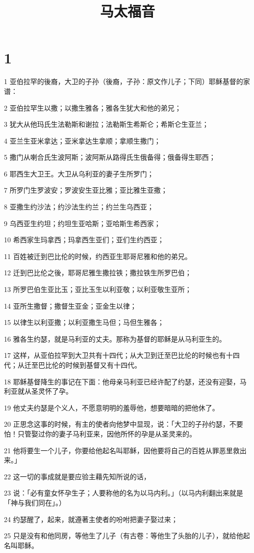 

\title{马太福音}


\chapter{1}

\par 1 亚伯拉罕的後裔，大卫的子孙（後裔，子孙：原文作儿子；下同）耶稣基督的家谱：
\par 2 亚伯拉罕生以撒；以撒生雅各；雅各生犹大和他的弟兄；
\par 3 犹大从他玛氏生法勒斯和谢拉；法勒斯生希斯仑；希斯仑生亚兰；
\par 4 亚兰生亚米拿达；亚米拿达生拿顺；拿顺生撒门；
\par 5 撒门从喇合氏生波阿斯；波阿斯从路得氏生俄备得；俄备得生耶西；
\par 6 耶西生大卫王。大卫从乌利亚的妻子生所罗门；
\par 7 所罗门生罗波安；罗波安生亚比雅；亚比雅生亚撒；
\par 8 亚撒生约沙法；约沙法生约兰；约兰生乌西亚；
\par 9 乌西亚生约坦；约坦生亚哈斯；亚哈斯生希西家；
\par 10 希西家生玛拿西；玛拿西生亚们；亚们生约西亚；
\par 11 百姓被迁到巴比伦的时候，约西亚生耶哥尼雅和他的弟兄。
\par 12 迁到巴比伦之後，耶哥尼雅生撒拉铁；撒拉铁生所罗巴伯；
\par 13 所罗巴伯生亚比玉；亚比玉生以利亚敬；以利亚敬生亚所；
\par 14 亚所生撒督；撒督生亚金；亚金生以律；
\par 15 以律生以利亚撒；以利亚撒生马但；马但生雅各；
\par 16 雅各生约瑟，就是马利亚的丈夫。那称为基督的耶稣是从马利亚生的。
\par 17 这样，从亚伯拉罕到大卫共有十四代；从大卫到迁至巴比伦的时候也有十四代；从迁至巴比伦的时候到基督又有十四代。
\par 18 耶稣基督降生的事记在下面：他母亲马利亚已经许配了约瑟，还没有迎娶，马利亚就从圣灵怀了孕。
\par 19 他丈夫约瑟是个义人，不愿意明明的羞辱他，想要暗暗的把他休了。
\par 20 正思念这事的时候，有主的使者向他梦中显现，说：「大卫的子孙约瑟，不要怕！只管娶过你的妻子马利亚来，因他所怀的孕是从圣灵来的。
\par 21 他将要生一个儿子，你要给他起名叫耶稣，因他要将自己的百姓从罪恶里救出来。」
\par 22 这一切的事成就是要应验主藉先知所说的话，
\par 23 说：「必有童女怀孕生子；人要称他的名为以马内利。」（以马内利翻出来就是「神与我们同在」。）
\par 24 约瑟醒了，起来，就遵著主使者的吩咐把妻子娶过来；
\par 25 只是没有和他同房，等他生了儿子（有古卷：等他生了头胎的儿子），就给他起名叫耶稣。

